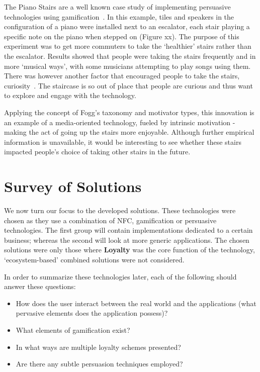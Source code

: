 The Piano Stairs are a well known case study of implementing persuasive technologies using gamification~\cite{pianostairs}. In this example, tiles and speakers in the configuration of a piano were installed next to an escalator, each stair playing a specific note on the piano when stepped on (Figure xx). The purpose of this experiment was to get more commuters to take the `healthier' stairs rather than the escalator. Results showed that people were taking the stairs frequently and in more `musical ways', with some musicians attempting to play songs using them. There was however another factor that encouraged people to take the stairs, curiosity~\cite{tieben2011curiosity}. The staircase is so out of place that people are curious and thus want to explore and engage with the technology.

Applying the concept of Fogg's taxonomy and motivator types, this innovation is an example of a media-oriented technology, fueled by intrinsic motivation - making the act of going up the stairs more enjoyable. Although further empirical information is unavailable, it would be interesting to see whether these stairs impacted people's choice of taking other stairs in the future. 

\clearpage{}
\section{Survey of Solutions}
We now turn our focus to the developed solutions. These technologies were chosen as they use a combination of NFC, gamification or persuasive technologies. The first group will contain implementations dedicated to a certain business; whereas the second will look at more generic applications. The chosen solutions were only those where \textbf{Loyalty} was the core function of the technology, `ecosystem-based' combined solutions were not considered.

In order to summarize these technologies later, each of the following should answer these questions:
\begin{itemize}
  \item How does the user interact between the real world and the applications (what pervasive elements does the application possess)?
  \item What elements of gamification exist?
    \item In what ways are multiple loyalty schemes presented? %
  \item Are there any subtle persuasion techniques employed?
\end{itemize}


